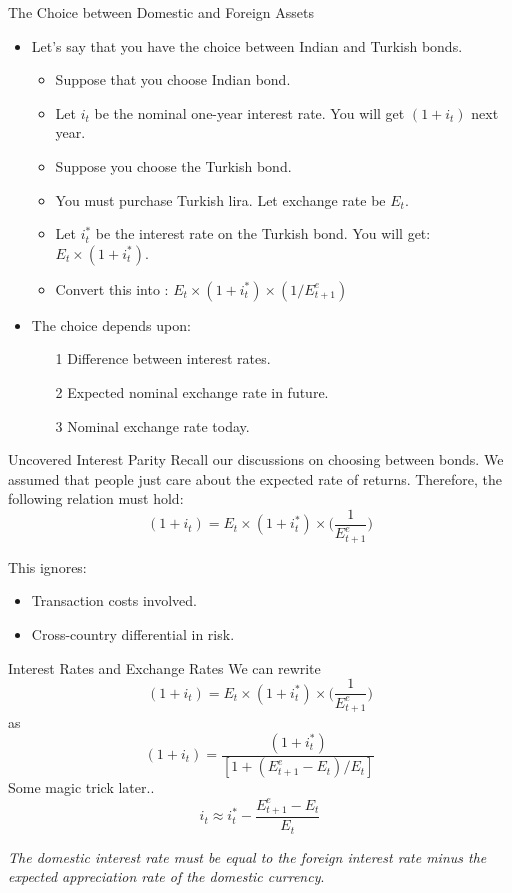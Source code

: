\documentclass[shownotes,11pt, aspectratio=169]{beamer}
\begin{document}
\begin{frame}{The Choice between Domestic and Foreign Assets}
\begin{itemize}
\item Let's say that you have the choice between Indian and Turkish bonds.
     \begin{itemize}
     \item Suppose that you choose Indian bond.
     \item Let $i_t$ be the nominal one-year interest rate. You will get \rupee $(1 + i_t)$ next year.
     \pause
     \item Suppose you choose the Turkish bond.
     \item You must purchase Turkish lira. Let exchange rate be $E_t$.
     \item Let $i_t^{\ast}$ be the interest rate on the Turkish bond. You will get: $E_t\times(1 + i_t^{\ast})$.
     \item Convert this into \rupee: $E_t\times(1 + i_t^{\ast})\times(1/E^{e}_{t+1})$
     \end{itemize}
\pause
\item The choice depends upon:
       \begin{itemize}
       \item[1] Difference between interest rates.
       \item[2] Expected nominal exchange rate in future.
       \item[3] Nominal exchange rate today.
       \end{itemize}
\end{itemize}
\end{frame}

\begin{frame}{Uncovered Interest Parity}
Recall our discussions on choosing between bonds. We assumed that people just care about the expected rate of returns. 
Therefore, the following relation must hold:
 \[ (1 + i_t) = E_t\times(1 + i_t^{\ast})\times\Bigg(\frac{1}{E^{e}_{t+1}}\Bigg) \]
\pause
\vspace{3mm}

This ignores:
\begin{itemize}
\item Transaction costs involved. 
\item Cross-country differential in risk.
\end{itemize}
\end{frame}

\begin{frame}{Interest Rates and Exchange Rates}
We can rewrite 
\[ (1 + i_t) = E_t\times(1 + i_t^{\ast})\times\Bigg(\frac{1}{E^{e}_{t+1}}\Bigg) \]
as
\[ (1 + i_t) = \frac{(1 + i_t^{\ast})}{[1 + (E^{e}_{t+1} - E_t)/E_t]} \]
\pause
Some magic trick later..
\[ i_t \approx i_t^{\ast} - \frac{E^{e}_{t+1} - E_t}{E_t} \]
\pause
\vspace{3mm}

\textit{The domestic interest rate must be equal to the foreign interest rate minus the expected appreciation rate of the domestic currency}.
\end{frame}
\end{document}
